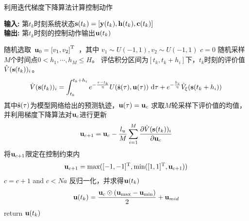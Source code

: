 \begin{algorithm}[htb]
\caption{利用迭代梯度下降算法计算控制动作} %
\label{alg:find_optimal_policy}
\hspace*{0.02in} {\bf 输入:} %
第$t_k$时刻系统状态$\mathbf s(t_k)=[\mathbf y(t_k),\mathbf h(t_k),\mathbf c(t_k)]$\\
\hspace*{0.02in} {\bf 输出:} %
第$t_k$时刻的控制动作输出${\mathbf u}(t_k)$
\begin{algorithmic}[1]
\State 随机选取$
\begin{array}{c}{\mathbf u_{0}=\left[v_{1}, v_{2}\right]^{\rm T}} \end{array}
$，其中 $v_{1} \sim U(-1,1) , v_{2} \sim U(-1,1)$ 
\State $c=0$
  \Do
    \State 随机采样$M$个时间点$0 < h_1, \cdots, h_M \leq H$。
    \State 评估积分区间为$[t_k,t_k+h_i]$下，$t_k$时刻的评价值$\hat{V}(\mathbf s(t_k))_i$。
    \begin{equation}
    \hat{V}(\mathbf s(t_k))_i = \int_{t_k}^{t_k+h_i}e^{-\frac{\tau-t_k}{\eta}}U(\hat{\mathbf s}(\tau),{\mathbf u}(\tau))\mathrm{~d}\tau+e^{-\frac{h_i}{\eta}}\hat{V}_\xi(\mathbf s(t_k+h_i)) 
    \label{equ:estimate_J_next}
    \end{equation}
    其中$\hat{\mathbf s}(\tau)$为模型网络给出的预测轨迹，$\mathbf u(\tau)=\mathbf u _c$
\EndFor
\State 求取$M$轮采样下评价值的均值，并利用梯度下降算法对$\mathbf u_c$进行更新
\begin{equation}
\mathbf u_{c+1}=\mathbf u_c- \frac{l_u}{M}\sum_{i=1}^{M}\frac{\partial \hat{V}(\mathbf s(t_k))_i}{\partial \mathbf u_{c}}
\end{equation}
\State 将$\mathbf u_{c+1}$限定在控制约束内
\begin{equation}
\mathbf u_{c+1} = \max([-1,-1]^{\rm T}, \min([1,1]^{\rm T},\mathbf u_{c+1}))
\end{equation}
\State $c=c+1$
   and $c<Na$ %
  \State 反归一化，并求得${\mathbf u}(t_k)$
 \begin{equation}
\mathbf u(t_k)=\frac{\mathbf u_{c} \odot\left(\mathbf u_{\max }-\mathbf u_{\min
}\right)}{2}+\mathbf u_{mid }
\end{equation}
\State return $\mathbf u(t_k)$
\end{algorithmic}

\end{algorithm}

